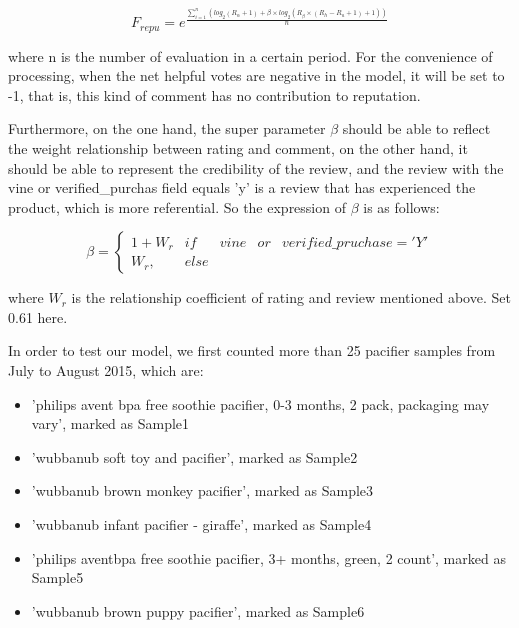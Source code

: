\documentclass{mcmthesis}
\begin{document}
\begin{equation}
	F_{repu} =  e^{\frac{\sum_{i=1}^{n}(log_2(R_{\alpha}+1)+ \beta \times log_2(R_{\beta}\times(R_{h}-R_{u}+1)+1))}{n}}
	\label{priA}
\end{equation}

where n is the number of evaluation in a certain period. For the convenience of processing, when the net helpful votes are negative in the model, it will be set to -1, that is, this kind of comment has no contribution to reputation.

Furthermore, on the one hand, the super parameter $\beta$ should be able to reflect the weight relationship between rating and comment, on the other hand, it should be able to represent the credibility of the review, and the review with the vine or verified\_purchas field equals 'y' is a review that has experienced the product, which is more referential. So the expression of $\beta$ is as follows:

\begin{equation}
	\beta =\left\{\begin{matrix}
1+W_{r} & if &vine &or &verified\_pruchase = 'Y'\\ 
W_{r},& else
\end{matrix}\right.
\label{hyperbeta}
\end{equation}

where $W_{r}$ is the relationship coefficient of rating and review mentioned above. Set 0.61 here.

In order to test our model, we first counted more than 25 pacifier samples from July to August 2015, which are:
\begin{itemize}
	\item 'philips avent bpa free soothie pacifier, 0-3 months, 2 pack, packaging may vary', marked as Sample1
	\item 'wubbanub soft toy and pacifier', marked as Sample2
	\item 'wubbanub brown monkey pacifier', marked as Sample3
	\item 'wubbanub infant pacifier - giraffe', marked as Sample4
	\item 'philips aventbpa free soothie pacifier, 3+ months, green, 2 count', marked as Sample5
	\item 'wubbanub brown puppy pacifier', marked as Sample6
\end{itemize}
\end{document}
